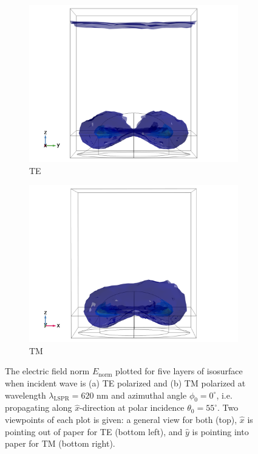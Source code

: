 \begin{figure}[h!]
    \begin{subfigure}{0.5\textwidth}
        \centering
        \includegraphics[width=\linewidth, trim=0.6cm 0 1.6cm 0, clip]{figures/ch4/S5A/FieldDistribution/isosurface/Sample5A_nomE_wl620_phi0_TE_xoutofpaper.png}
        \caption{TE}
    \end{subfigure}
    \begin{subfigure}{0.5\textwidth}
        \centering
        \includegraphics[width=\linewidth, trim=0.6cm 0 1.6cm 0, clip]{figures/ch4/S5A/FieldDistribution/isosurface/Sample5A_nomE_wl620_phi0_TM_yintopaper.png}
        \caption{TM}
    \end{subfigure}
    \caption{The electric field norm $E_\text{norm}$ plotted for five layers of isosurface when incident wave is (a) TE polarized and (b) TM polarized at wavelength $\lambda_{\text{LSPR}}=620$ nm and azimuthal angle $\phi_0=0^\circ$, i.e. propagating along $\hat{x}$-direction at polar incidence $\theta_0=55^\circ$. Two viewpoints of each plot is given: a general view for both (top), $\hat{x}$ is pointing out of paper for TE (bottom left), and $\hat{y}$ is pointing into paper for TM (bottom right).}
    \label{fig:S5A_normE_isosurface_LSPR}
\end{figure}



